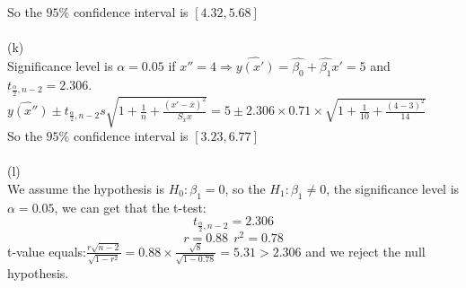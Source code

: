 \documentclass[11pt]{article}
\begin{document}
    So the $95\%$ confidence interval is $[4.32, 5.68]$
    \\
    \\
    (k) \\
    Significance level is $\alpha = 0.05$ if $x'' = 4 \Rightarrow \hat{y(x')} = \hat{\beta_0}+ \hat{\beta_1}x' = 5$ and $t_{\frac{\alpha}{2}, n-2} = 2.306$. \\
    $\hat{y(x'')} \pm t_{\frac{\alpha}{2}, n-2} s \sqrt{1 + \frac{1}{n} + \frac{(x'-\overline{x})^2}{S_xx}} = 5 \pm 2.306 \times 0.71 \times \sqrt{1 + \frac{1}{10} + \frac{(4 - 3)^2}{14}}$ \\
    So the $95\%$ confidence interval is $[3.23,6.77]$
    \\
    \\
    (l) \\
    We assume the hypothesis is $H_0: \beta_1 = 0$, so the $H_1: \beta_1 \neq 0$, the significance level is $\alpha = 0.05$, we can get that the t-test: $$t_{\frac{\alpha}{2}, n-2} = 2.306$$
    $$r = 0.88 \ \  r^2 = 0.78$$
    t-value equals:$\frac{r\sqrt{n-2}}{\sqrt{1-r^2}} = 0.88 \times \frac{\sqrt{8}}{\sqrt{1-0.78}} = 5.31 > 2.306$ and we reject the null hypothesis.
\end{document}
